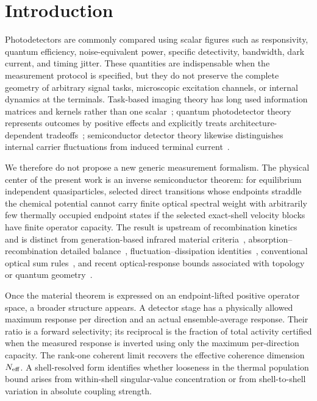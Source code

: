 \documentclass[aps,twocolumn,superscriptaddress,longbibliography]{revtex4-2}
\begin{document}
\maketitle

\section{Introduction}

Photodetectors are commonly compared using scalar figures such as responsivity, quantum efficiency, noise-equivalent power, specific detectivity, bandwidth, dark current, and timing jitter. These quantities are indispensable when the measurement protocol is specified, but they do not preserve the complete geometry of arbitrary signal tasks, microscopic excitation channels, or internal dynamics at the terminals. Task-based imaging theory has long used information matrices and kernels rather than one scalar~\cite{Barrett1995,Clarkson2010}; quantum photodetector theory represents outcomes by positive effects and explicitly treats architecture-dependent tradeoffs~\cite{Young2018,Xu2020}; semiconductor detector theory likewise distinguishes internal carrier fluctuations from induced terminal current~\cite{Dabrowski1987,Dabrowski1989}.

We therefore do not propose a new generic measurement formalism. The physical center of the present work is an inverse semiconductor theorem: for equilibrium independent quasiparticles, selected direct transitions whose endpoints straddle the chemical potential cannot carry finite optical spectral weight with arbitrarily few thermally occupied endpoint states if the selected exact-shell velocity blocks have finite operator capacity. The result is upstream of recombination kinetics and is distinct from generation-based infrared material criteria~\cite{Piotrowski1997}, absorption--recombination detailed balance~\cite{VanRoosbroeck1954}, fluctuation--dissipation identities~\cite{Callen1951}, conventional optical sum rules~\cite{Watanabe2020,Gusynin2006,Gusynin2007}, and recent optical-response bounds associated with topology or quantum geometry~\cite{Onishi2024,Mao2025}.

Once the material theorem is expressed on an endpoint-lifted positive operator space, a broader structure appears. A detector stage has a physically allowed maximum response per direction and an actual ensemble-average response. Their ratio is a forward selectivity; its reciprocal is the fraction of total activity certified when the measured response is inverted using only the maximum per-direction capacity. The rank-one coherent limit recovers the effective coherence dimension $N_{\rm eff}$. A shell-resolved form identifies whether looseness in the thermal population bound arises from within-shell singular-value concentration or from shell-to-shell variation in absolute coupling strength.
\end{document}

